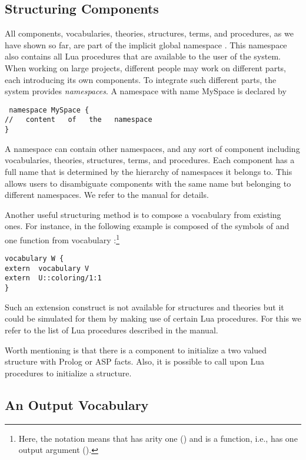 \subsection{Structuring Components}

All components, vocabularies, theories, structures, terms, and
procedures, as we have shown so far, are part of the implicit global
namespace . This namespace also contains all Lua
procedures that are available to the user of the system. When working
on large projects, different people may work on different parts, each
introducing its own components. To integrate such different parts, the
\idp system provides \emph{namespaces}.  A namespace with name
MySpace is declared by
\begin{lstlisting}
 namespace MySpace {
//   content   of   the   namespace
}
\end{lstlisting}
A namespace can contain other namespaces, and any sort of \idp component including vocabularies, theories,
structures, terms, and procedures. Each component has a full name that is determined by the
hierarchy of namespaces it belongs to. This allows users to
disambiguate components with the same name but belonging to different
namespaces. We refer to the manual for details.

Another useful structuring method is to compose a vocabulary from existing ones. For instance, in the following example  is composed of the symbols of  and one function  from vocabulary :\footnote{Here, the notation  means that  has arity one () and is a function, i.e., has one output argument ().} 
\begin{lstlisting}
vocabulary W {
extern  vocabulary V
extern  U::coloring/1:1
}
\end{lstlisting}
Such an extension construct is not available for structures and
theories but it could be simulated for them by making use of certain
Lua procedures. For this we refer to the list of Lua procedures
described in the manual. 

Worth mentioning is that there is a
 component to initialize a two valued structure with
Prolog or ASP facts. Also, it is possible to call upon Lua procedures
to initialize a structure. 

\subsection{An Output Vocabulary} 

